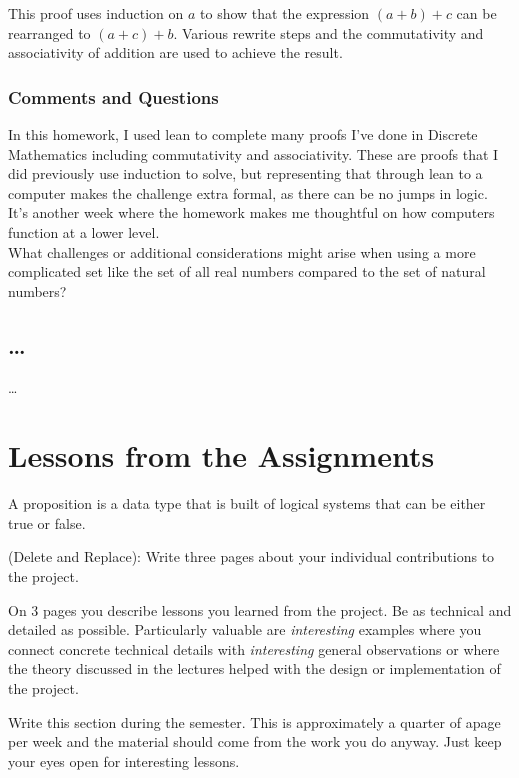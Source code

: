\documentclass{article}
\theoremstyle{theorem}
\theoremstyle{definition}
\theoremstyle{remark}
\begin{document}
{This proof uses induction on \( a \) to show that the expression \( (a + b) + c \) can be rearranged to \( (a + c) + b \). Various rewrite steps and the commutativity and associativity of addition are used to achieve the result.


\subsubsection*{Comments and Questions}

In this homework, I used lean to complete many proofs I've done in Discrete Mathematics including commutativity and associativity. These are proofs that I did previously use induction to solve, but representing that through lean to a computer makes the challenge extra formal, as there can be no jumps in logic. It's another week where the homework makes me thoughtful on how computers function at a lower level. \\

What challenges or additional considerations might arise when using a more complicated set like the set of all real numbers compared to the set of natural numbers?


\subsection{\ldots}

\ldots

\section{Lessons from the Assignments}

A proposition is a data type that is built of logical systems that can be either true or false.

(Delete and Replace): Write three pages about your individual contributions to the project.

On 3 pages you describe lessons you learned from the project. Be as technical and detailed as possible. Particularly valuable are \emph{interesting} examples where you connect concrete technical details with \emph{interesting} general observations or where the theory discussed in the lectures helped with the design or implementation of the project.


Write this section during the semester. This is approximately a quarter of apage per week and the material should come from the work you do anyway. Just keep your eyes open for interesting lessons.

}
\end{document}

